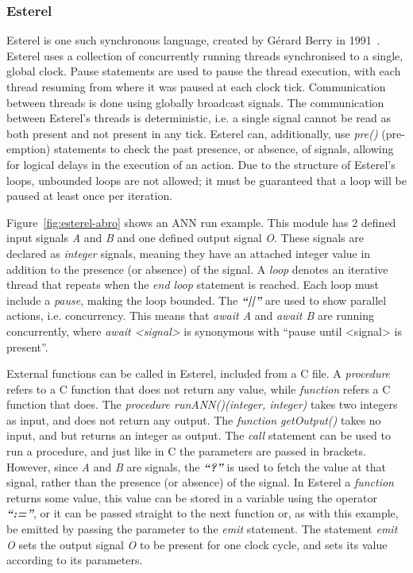 \subsubsection{Esterel}
Esterel is one such synchronous language, created by Gérard Berry in 1991~\cite{berry1991}. 
Esterel uses a collection of concurrently running threads synchronised to a single, global clock.
Pause statements are used to pause the thread execution, with each thread resuming from where it was paused at each clock tick.
Communication between threads is done using globally broadcast signals.
The communication between Esterel's threads is deterministic, i.e. a single signal cannot be read as both present and not present in any tick.
Esterel can, additionally, use \textit{pre()} (pre-emption) statements to check the past presence, or absence, of signals, allowing for logical delays in the execution of an action.
Due to the structure of Esterel's loops, unbounded loops are not allowed; it must be guaranteed that a loop will be paused at least once per iteration.

Figure~\ref{fig:esterel-abro} shows an \ac{ANN} run example.
This module has 2 defined input signals \textit{A} and \textit{B} and one defined output signal \textit{O}.
These signals are declared as \textit{integer} signals, meaning they have an attached integer value in addition to the presence (or absence) of the signal.
A \textit{loop} denotes an iterative thread that repeats when the \textit{end loop} statement is reached.
Each loop must include a \textit{pause}, making the loop bounded. 
The \textbf{\emph{``||''}} are used to show parallel actions, i.e. concurrency.
This means that \textit{await A} and \textit{await B} are running concurrently, where \textit{await <signal>} is synonymous with ``pause until <signal> is present''.

External functions can be called in Esterel, included from a C file.
A \textit{procedure} refers to a C function that does not return any value, while \textit{function} refers a C function that does.
The \textit{procedure runANN()(integer, integer)} takes two integers as input, and does not return any output.
The \textit{function getOutput()} takes no input, and but returns an integer as output.
The \textit{call} statement can be used to run a procedure, and just like in C the parameters are passed in brackets.
However, since \textit{A} and \textit{B} are signals, the \textbf{\emph{``?''}} is used to fetch the value at that signal, rather than the presence (or absence) of the signal.
In Esterel a \textit{function} returns some value, this value can be stored in a variable using the operator \textbf{\emph{``:=''}}, or it can be passed straight to the next function or, as with this example, be emitted by passing the parameter to the \textit{emit} statement.
The statement \textit{emit O} sets the output signal \textit{O} to be present for one clock cycle, and sets its value according to its parameters.


